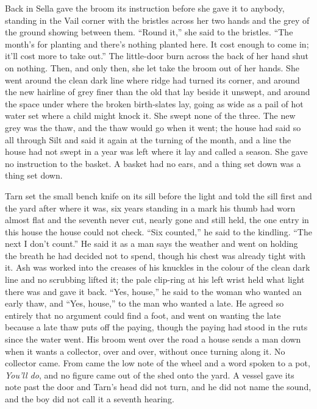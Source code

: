 \scenebreak

Back in  Sella gave the broom its instruction before she gave it to anybody, standing in the Vail corner with the bristles across her two hands and the grey of the ground showing between them. “Round it,” she said to the bristles. “The month's for planting and there's nothing planted here. It cost enough to come in; it'll cost more to take out.” The little-door burn across the back of her hand shut on nothing. Then, and only then, she let  take the broom out of her hands. She went around the clean dark line where  ridge had turned its corner, and around the new hairline of grey finer than the old that lay beside it unswept, and around the space under  where the broken birth-slates lay, going as wide as a pail of hot water set where a child might knock it. She swept none of the three. The new grey was the thaw, and the thaw would go when it went; the house had said so all through Silt and said it again at the turning of the month, and a line the house had not swept in a year was left where it lay and called a season. She gave no instruction to the basket. A basket had no ears, and a thing set down was a thing set down.

Tarn set the small bench knife on its sill before the light and told the sill first and the yard after where it was, six years standing in a mark his thumb had worn almost flat and the seventh never cut, nearly gone and still held, the one entry in this house the house could not check. “Six counted,” he said to the kindling. “The next I don't count.” He said it as a man says the weather and went on holding the breath he had decided not to spend, though his chest was already tight with it. Ash was worked into the creases of his knuckles in the colour of the clean dark line and no scrubbing lifted it; the pale clip-ring at his left wrist held what light there was and gave it back. “Yes, house,” he said to the woman who wanted an early thaw, and “Yes, house,” to the man who wanted a late. He agreed so entirely that no argument could find a foot, and went on wanting the late because a late thaw puts off the paying, though the paying had stood in the ruts since the water went. His broom went over the road a house sends a man down when it wants a collector, over and over, without once turning along it. No collector came. From  came the low note of the wheel and a word spoken to a pot, \emph{You'll do}, and no figure came out of the shed onto the yard. A vessel gave its note past the door and Tarn's head did not turn, and he did not name the sound, and the boy did not call it a seventh hearing.

